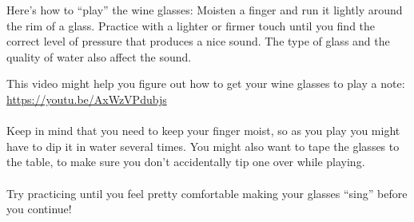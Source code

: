 \documentclass[12pt,noauthor,nooutcomes,hints,instructornotes]{ximera}%
\begin{document}
Here's how to ``play'' the wine glasses: Moisten a finger and run it lightly around the rim of a glass. Practice with a lighter or firmer touch until you find the correct level of pressure that produces a nice sound. The type of glass and the quality of water also affect the sound.

This video might help you figure out how to get your wine glasses to play a note:\\
\url{https://youtu.be/AxWzVPdubjs}
\\
\\
Keep in mind that you need to keep your finger moist, so as you play you might have to dip it in water several times. You might also want to tape the glasses to the table, to make sure you don't accidentally tip one over while playing.\\
\\
Try practicing until you feel pretty comfortable making your glasses ``sing'' before you continue!
\end{document}
